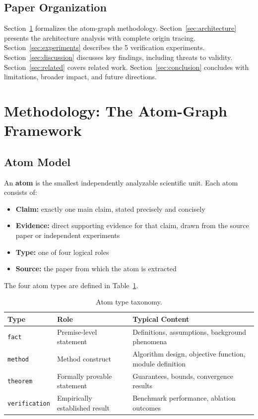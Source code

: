 \documentclass[11pt,a4paper]{article}
\begin{document}
\subsection{Paper Organization}

Section~\ref{sec:methodology} formalizes the atom-graph methodology. Section~\ref{sec:architecture} presents the architecture analysis with complete origin tracing. Section~\ref{sec:experiments} describes the 5 verification experiments. Section~\ref{sec:discussion} discusses key findings, including threats to validity. Section~\ref{sec:related} covers related work. Section~\ref{sec:conclusion} concludes with limitations, broader impact, and future directions.

\section{Methodology: The Atom-Graph Framework}
\label{sec:methodology}

\subsection{Atom Model}

An \textbf{atom} is the smallest independently analyzable scientific unit. Each atom consists of:

\begin{itemize}
    \item \textbf{Claim:} exactly one main claim, stated precisely and concisely
    \item \textbf{Evidence:} direct supporting evidence for that claim, drawn from the source paper or independent experiments
    \item \textbf{Type:} one of four logical roles
    \item \textbf{Source:} the paper from which the atom is extracted
\end{itemize}

The four atom types are defined in Table~\ref{tab:atom-types}.

\begin{table}[H]
\centering
\caption{Atom type taxonomy.}
\label{tab:atom-types}
\begin{tabular}{lll}
\toprule
\textbf{Type} & \textbf{Role} & \textbf{Typical Content} \\
\midrule
\texttt{fact} & Premise-level statement & Definitions, assumptions, background phenomena \\
\texttt{method} & Method construct & Algorithm design, objective function, module definition \\
\texttt{theorem} & Formally provable statement & Guarantees, bounds, convergence results \\
\texttt{verification} & Empirically established result & Benchmark performance, ablation outcomes \\
\bottomrule
\end{tabular}
\end{table}
\end{document}
